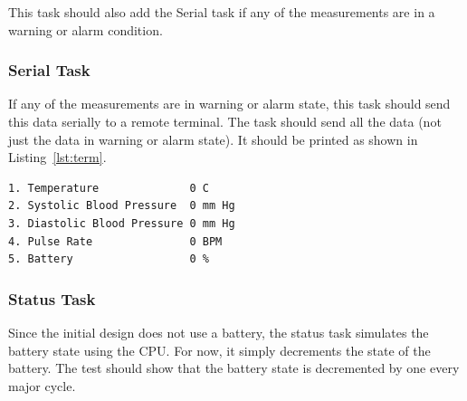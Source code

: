 \documentclass[12pt]{article} %
\begin{document}
    This task should also add the Serial task if any of the measurements are in
    a warning or alarm condition.

    \subsubsection{Serial Task}
    If any of the measurements are in warning or alarm state, this task should
    send this data serially to a remote terminal.  The task should send all the
    data (not just the data in warning or alarm state).  It should be printed as
    shown in Listing~\ref{lst:term}.\\

\begin{lstlisting}[caption=Remote Terminal Output, captionpos=b, label=lst:term]
1. Temperature              0 C
2. Systolic Blood Pressure  0 mm Hg
3. Diastolic Blood Pressure 0 mm Hg
4. Pulse Rate               0 BPM
5. Battery                  0 % 
\end{lstlisting}

    \subsubsection{Status Task} Since the initial design does not use a
    battery, the status task simulates the battery state using the CPU. For
    now, it simply decrements the state of the battery. The test should show
    that the battery state is decremented by one every major cycle.
\end{document}

